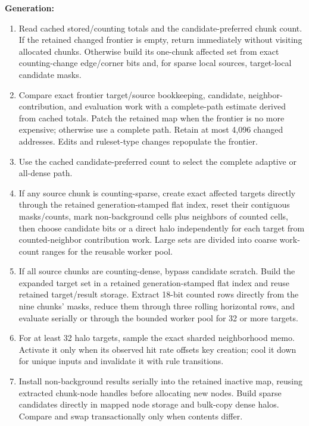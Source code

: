 \textbf{Generation:}
\begin{enumerate}
  \item Read cached stored/counting totals and the candidate-preferred chunk
        count. If the retained changed frontier is empty, return immediately
        without visiting allocated chunks. Otherwise build its one-chunk
        affected set from exact counting-change edge/corner bits and, for sparse
        local sources, target-local candidate masks.
  \item Compare exact frontier target/source bookkeeping, candidate,
        neighbor-contribution, and evaluation work with a complete-path
        estimate derived from cached totals. Patch the retained map when the
        frontier is no more expensive; otherwise use a complete path. Retain
        at most 4,096 changed addresses. Edits and ruleset-type changes
        repopulate the frontier.
  \item Use the cached candidate-preferred count to select the complete
        adaptive or all-dense path.
  \item If any source chunk is counting-sparse, create exact affected targets
        directly through the
        retained generation-stamped flat index, reset their contiguous
        masks/counts, mark non-background cells plus neighbors of counted cells,
        then choose candidate bits or a direct halo independently for each
        target from counted-neighbor contribution work. Large sets are divided
        into coarse work-count ranges for the reusable worker pool.
  \item If all source chunks are counting-dense, bypass candidate scratch.
        Build the expanded target set in a retained generation-stamped flat
        index and reuse retained target/result storage. Extract 18-bit counted
        rows directly from the nine chunks' masks, reduce them through three
        rolling horizontal rows, and evaluate serially or through the bounded
        worker pool for 32 or more targets.
  \item For at least 32 halo targets, sample the exact sharded neighborhood
        memo. Activate it only when its observed hit rate offsets key creation;
        cool it down for unique inputs and invalidate it with rule transitions.
  \item Install non-background results serially into the retained inactive map,
        reusing extracted chunk-node handles before allocating new nodes. Build
        sparse candidates directly in mapped node storage and bulk-copy dense
        halos. Compare
        and swap transactionally only when contents differ.
\end{enumerate}

